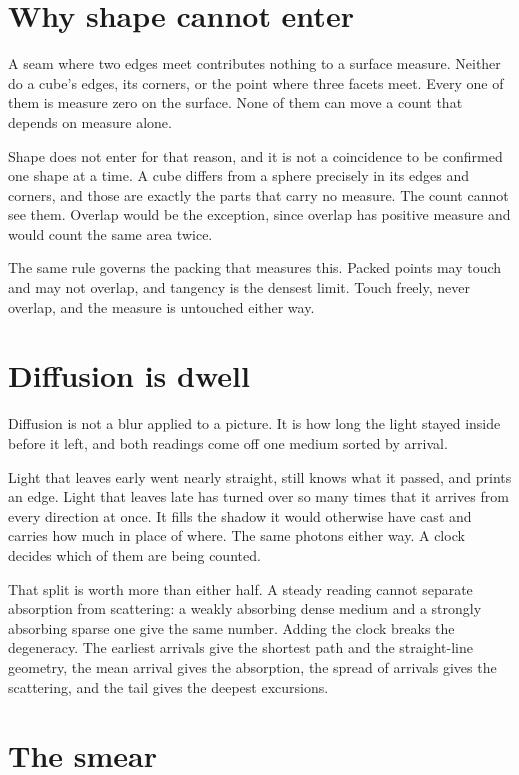 \section{Why shape cannot enter}

A seam where two edges meet contributes nothing to a surface measure. Neither do a cube's edges, its corners, or the point where three facets meet. Every one of them is measure zero on the surface. None of them can move a count that depends on measure alone.

Shape does not enter for that reason, and it is not a coincidence to be confirmed one shape at a time. A cube differs from a sphere precisely in its edges and corners, and those are exactly the parts that carry no measure. The count cannot see them. Overlap would be the exception, since overlap has positive measure and would count the same area twice.

The same rule governs the packing that measures this. Packed points may touch and may not overlap, and tangency is the densest limit. Touch freely, never overlap, and the measure is untouched either way.

\section{Diffusion is dwell}

Diffusion is not a blur applied to a picture. It is how long the light stayed inside before it left, and both readings come off one medium sorted by arrival.

Light that leaves early went nearly straight, still knows what it passed, and prints an edge. Light that leaves late has turned over so many times that it arrives from every direction at once. It fills the shadow it would otherwise have cast and carries how much in place of where. The same photons either way. A clock decides which of them are being counted.

That split is worth more than either half. A steady reading cannot separate absorption from scattering: a weakly absorbing dense medium and a strongly absorbing sparse one give the same number. Adding the clock breaks the degeneracy. The earliest arrivals give the shortest path and the straight-line geometry, the mean arrival gives the absorption, the spread of arrivals gives the scattering, and the tail gives the deepest excursions.

\section{The smear}


